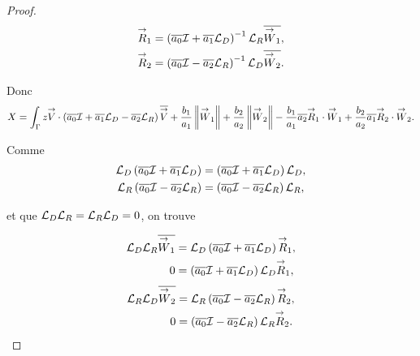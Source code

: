 \begin{proof}
    \newcommand{\vR}{\vect{R}}

    \begin{align*}
      \vR_1 & = \left(\conj{a_0}\oI  + \conj{a_1} \LD \right)^{-1}\LR \conj{\vW_1},
      \\
      \vR_2 & = \left(\conj{a_0}\oI  - \conj{a_2} \LR \right)^{-1}\LD \conj{\vW_2}.
    \end{align*}

    Donc 
    \begin{equation*}
      X = \int_\Gamma z \vV \cdot \left(\conj{a_0}\oI  + \conj{a_1} \LD - \conj{a_2}\LR\right)\conj{\vV} + \frac{b_1}{a_1} \norm{\vW_1} +\frac{b_2}{a_2} \norm{\vW_2} - \frac{b_1}{a_1}\conj{a_2}\vR_1\cdot\vW_1 + \frac{b_2}{a_2}\conj{a_1}\vR_2\cdot\vW_2.
    \end{equation*}

    Comme
    \begin{align*}
      {\mathcal{L}_D}\left({\overline{a_0}}{\mathcal{I}}  + {\overline{a_1}} {\mathcal{L}_D} \right)&=\left({\overline{a_0}}{\mathcal{I}}  + {\overline{a_1}} {\mathcal{L}_D} \right){\mathcal{L}_D},
      \\
      {\mathcal{L}_R}\left({\overline{a_0}}{\mathcal{I}}  - {\overline{a_2}} {\mathcal{L}_R} \right)&=\left({\overline{a_0}}{\mathcal{I}}  - {\overline{a_2}} {\mathcal{L}_R} \right){\mathcal{L}_R},
    \end{align*}

    et que \({\mathcal{L}_D}{\mathcal{L}_R}={\mathcal{L}_R}{\mathcal{L}_D}=0\), on trouve

    \begin{equation*}
      \begin{aligned}
        \LD\LR\conj{\vW_1} &= \LD\left(\conj{a_0}\oI  + \conj{a_1} \LD \right)\vR_1,
        \\
        0 & =\left(\conj{a_0}\oI  + \conj{a_1} \LD \right)\LD\vR_1,
      \end{aligned}
    \end{equation*}
    \begin{equation*}
      \begin{aligned}
        \LR\LD\conj{\vW_2} &= \LR\left(\conj{a_0}\oI  - \conj{a_2} \LR \right)\vR_2,
        \\
        0 & =\left(\conj{a_0}\oI  - \conj{a_2} \LR \right)\LR\vR_2.
      \end{aligned}
    \end{equation*}



\end{proof}
